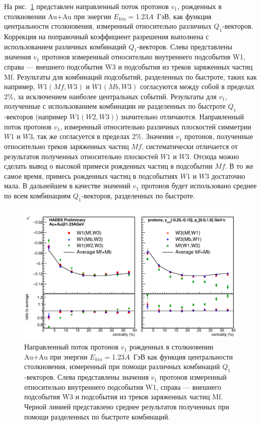 На рис.~\ref{fig:hades_w1w3} представлен направленный поток протонов $v_1$, рожденных в столкновении Au+Au при энергии $E_{kin}=$1.23$A$~ГэВ, как функция центральности столкновения, измеренный относительно различных $Q_1$-векторов. 
Коррекция на поправочный коэффициент разрешения выполнена с использованием различных комбинаций $Q_1$-векторов.
Слева представлены значения $v_1$ протонов измеренный относительно внутреннего подсобытия W1, справа --- внешнего подсобытия W3 и подсобытия из треков заряженных частиц Mf. 
Результаты для комбинаций подсобытий, разделенных по быстроте, таких как например, $W1(Mf,W3)$ и $W1(Mb,W3)$ согласуются между собой в пределах 2\%, за исключением наиболее центральных событий. 
Результаты для $v_1$, полученные с использованием комбинации не разделенных по быстроте $Q_1$-векторов (например $W1(W2,W3)$) значительно отличаются.
Направленный поток протонов $v_1$, измеренный относительно различных плоскостей симметрии $W1$ и $W3$, так же согласуется в пределах 2\%.
Значения $v_1$ протонов, полученные относительно треков заряженных частиц $Mf$, систематически отличается от результатов полученных относительно плоскостей $W1$ и $W3$. 
Отсюда можно сделать вывод о высокой примеси рожденных частиц в подсобытии $Mf$.
В то же самое время, примесь рожденных частиц в подсобытиях $W1$ и $W3$ достаточно мала.
В дальнейшем в качестве значений $v_1$ протонов будет использовано среднее по всем комбинациям $Q_1$-векторов, разделенных по быстроте.
%
\begin{figure}[ht]
\begin{center}
\includegraphics[width=0.75\linewidth]{images/W1AndW3Nucleus.png}
\caption{Направленный поток протонов $v_1$ рожденных в столкновении Au+Au при энергии $E_{kin}=$1.23$A$~ГэВ как функция центральности столкновения, измеренный при помощи различных комбинаций $Q_1$-векторов. Слева представлены значения $v_1$ протонов измеренный относительно внутреннего подсобытия W1, справа --- внешнего подсобытия W3 и подсобытия из треков заряженных частиц Mf. Черной линией представлено среднее результатов полученных при помощи разделенных по быстроте комбинаций.}
\label{fig:hades_w1w3}
\end{center}
\end{figure}

